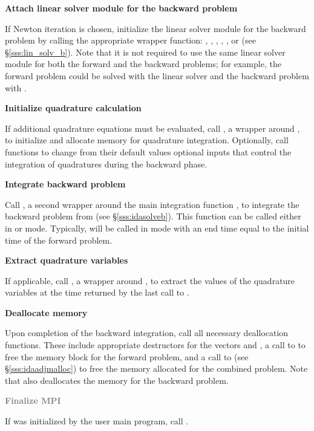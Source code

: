 \begin{Steps}
\item \label{i:lin_solverB}
  {\bf Attach linear solver module for the backward problem}

  If Newton iteration is chosen, initialize the linear solver module 
  for the backward problem by calling the appropriate wrapper
  function: , , ,
  , , or  (see \S\ref{sss:lin_solv_b}). 
  Note that it is not required
  to use the same linear solver module for both the forward and the 
  backward problems; for example, the forward problem could be solved
  with the {\idadense} linear solver and the backward problem with {\idaspgmr}.

\item \label{i:quadB}
  {\bf Initialize quadrature calculation}

  If additional quadrature equations must be evaluated, 
  call , a wrapper around ,
  to initialize and allocate memory for quadrature integration.
  Optionally, call  functions to change from their
  default values optional inputs that control the integration of
  quadratures during the backward phase.

\item
  {\bf Integrate backward problem}

  Call , a second wrapper around the {\idas} main integration
  function , to integrate the backward problem from 
  (see \S\ref{sss:idasolveb}). This function can be called either in 
  or  mode. Typically,  will be called in 
  mode with an end time equal to the initial time of the forward problem.

\item \label{i:back_end}
  {\bf Extract quadrature variables}

  If applicable, call , a wrapper around ,
  to extract the values of the quadrature variables at the time returned
  by the last call to .

\item
  {\bf Deallocate memory}

  Upon completion of the backward integration, call all necessary deallocation
  functions. These include appropriate destructors for the vectors 
   and , a call to  to free the {\idas} memory block 
  for the forward problem, and a call to  (see \S\ref{sss:idaadjmalloc}) to free 
  the memory allocated for the combined problem. 
  Note that  also deallocates the {\idas} memory for the backward problem.

\item
  \textcolor{gray}{\bf Finalize MPI}

  {\p} If {\mpi} was initialized by the user main program, call .

\end{Steps}

